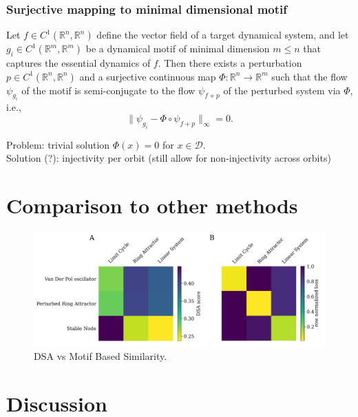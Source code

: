 \documentclass{article}
\theoremstyle{definition} \newtheorem{definition}{Definition}  \newtheorem{example}{Example}
\theoremstyle{remark} \newtheorem{remark}{Remark}
\newcounter{ct}
\begin{document}
\subsubsection{Surjective mapping to minimal dimensional motif}
Let \( f \in C^1(\mathbb{R}^n, \mathbb{R}^n) \) define the vector field of a target dynamical system, and let \( g_i \in C^1(\mathbb{R}^m, \mathbb{R}^m) \) be a dynamical motif of minimal dimension \( m \leq n \) that captures the essential dynamics of \( f \). Then there exists a perturbation \( p \in C^1(\mathbb{R}^n, \mathbb{R}^n) \) and a surjective continuous map \( \Phi: \mathbb{R}^n \to \mathbb{R}^m \) such that the flow \( \psi_{g_i} \) of the motif is semi-conjugate to the flow \( \psi_{f+p} \) of the perturbed system via \( \Phi \), i.e.,
\begin{equation}\label{eq:perfect_motif_fit}
\| \psi_{g_i} - \Phi \circ \psi_{f+p} \|_\infty = 0.
\end{equation}


Problem: trivial solution $\Phi(x) = 0$ for $x\in\mathcal{D}$.\\
Solution (?): injectivity per orbit (still allow for non-injectivity across orbits)


\section{}



\section{Comparison to other methods}
\begin{figure}[htbp]
    \centering
    \includegraphics[width=0.75\linewidth]{dsa_vs_mbs}
    \caption{DSA vs Motif Based Similarity.}
    \label{fig:ds_vs_mbs}
\end{figure}




\section{Discussion}
\end{document}
